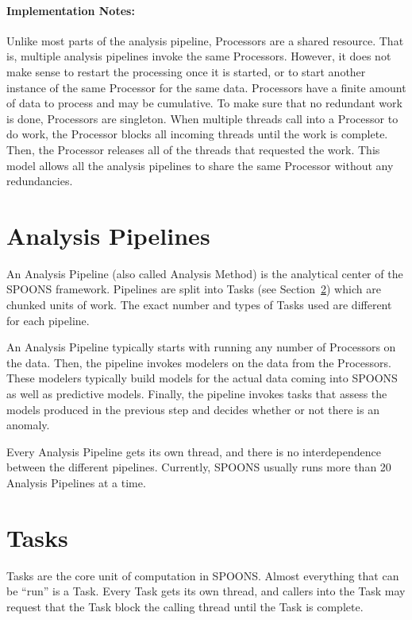 \documentclass[12pt]{ucthesis}
\begin{document}
\paragraph{Implementation Notes:}
Unlike most parts of the analysis pipeline, Processors are a shared resource. That is, multiple analysis pipelines
invoke the same Processors. However, it does not make sense to restart the processing once it is started, or to
start another instance of the same Processor for the same data. Processors have a finite amount of data to process and may be cumulative.
To make sure that no redundant work is done, Processors are singleton. When multiple threads call into a Processor to do work, the Processor blocks
all incoming threads until the work is complete. Then, the Processor releases all of the threads that requested the work.
This model allows all the analysis pipelines to share the same Processor without any redundancies.

\section{Analysis Pipelines}
\label{arch-pipelines}
An Analysis Pipeline (also called Analysis Method) is the analytical center of the SPOONS framework.
Pipelines are split into Tasks (see Section~\ref{arch-tasks}) which are chunked units of work.
The exact number and types of Tasks used are different for each pipeline.

An Analysis Pipeline typically starts with running any number of Processors on the data.
Then, the pipeline invokes modelers on the data from the Processors. These modelers typically build models for the
actual data coming into SPOONS as well as predictive models.
Finally, the pipeline invokes tasks that assess the models produced in the previous
step and decides whether or not there is an anomaly.

Every Analysis Pipeline gets its own thread, and there is no interdependence between the different pipelines.
Currently, SPOONS usually runs more than 20 Analysis Pipelines at a time.

\section{Tasks}
\label{arch-tasks}
Tasks are the core unit of computation in SPOONS. Almost everything that can be ``run'' is a Task.
Every Task gets its own thread, and callers into the Task may request that the Task block the calling thread
until the Task is complete.
\end{document}

